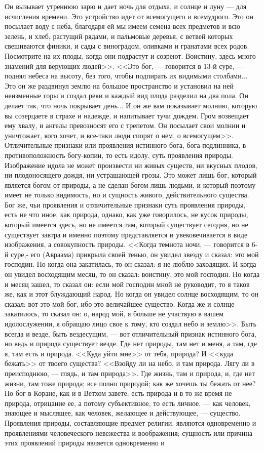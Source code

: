 \documentclass[12pt]{article}
\begin{document}
Он вызывает утреннюю зарю и дает ночь для отдыха, и солнце и луну --- для исчисления времени. Это устройство идет от всемогущего и всемудрого. Это он посылает воду с неба, благодаря ей мы имеем семена всех предметов и всю зелень, и хлеб, растущий рядами, и пальмовые деревья, с ветвей которых свешиваются финики, и сады с виноградом, оливками и гранатами всех родов. Посмотрите на их плоды, когда они подрастут и созреют. Воистину, здесь много знамений для верующих людей>>. <<Это бог, --- говорится в 13-й суре, --- поднял небеса на высоту, без того, чтобы подпирать их видимыми столбами... Это он же раздвинул землю на большое пространство и установил на ней неизменные горы и создал реки и каждый вид плода разделил на два пола. Он делает так, что ночь покрывает день... И он же вам показывает молнию, которую вы созерцаете в страхе и надежде, и напитывает тучи дождем. Гром возвещает ему хвалу, и ангелы превозносят его с трепетом. Он посылает свои молнии и уничтожает, кого хочет, и все-таки люди спорят о нем, о всемогущем>>. Отличительные признаки или проявления истинного бога, бога-подлинника, в противоположность богу-копии, то есть идолу, суть проявления природы. Изображение идола не может произвести ни живых существ, ни вкусных плодов, ни плодоносящего дождя, ни устрашающей грозы. Это может лишь бог, который является богом от природы, а не сделан богом лишь людьми, и который поэтому имеет не только видимость, но и сущность живого, действительного существа. Бог же, чьи проявления и отличительные признаки суть проявления природы, есть не что иное, как природа, однако, как уже говорилось, не кусок природы, который имеется здесь, но не имеется там, который существует сегодня, но не существует завтра и именно поэтому представляется и увековечивается в виде изображения, а совокупность природы. <<Когда темнота ночи, --- говорится в 6-й суре,- его (Авраама) прикрыла своей тенью, он увидел звезду и сказал: это мой господин. Но когда она закатилась, то он сказал: я не люблю заходящих. И когда он увидел восходящим месяц, то он сказал: воистину, это мой господин. Но когда и месяц зашел, то сказал он: если мой господин мной не руководит, то я таков же, как и этот блуждающий народ. Но когда он увидел солнце восходящим, то он сказал: вот это мой бог, ибо это величайшее существо. Когда же и солнце закатилось, то сказал он: о, народ мой, я больше не участвую в вашем идолослужении, я обращаю лицо свое к тому, кто создал небо и землю>>. Быть всегда и везде, быть вездесущим, --- вот отличительный признак истинного бога, но ведь и природа существует везде. Где нет природы, там нет и меня, а там, где я, там есть и природа. <<Куда уйти мне>> от тебя, природа? И <<куда бежать>> от твоего существа? <<Взойду ли на небо, и там природа. Лягу ли в преисподнюю, --- глядь, и там природа>>. Где жизнь, там и природа, и, где нет жизни, там тоже природа; все полно природой; как же хочешь ты бежать от нее? Но бог в Коране, как и в Ветхом завете, есть природа и в то же время не природа, отрицание ее, а потому субъективное, то есть личное, --- как человек, знающее и мыслящее, как человек, желающее и действующее, --- существо. Проявления природы, составляющие предмет религии, являются одновременно и проявлениями человеческого невежества и воображения; сущность или причина этих проявлений природы является одновременно и 
\end{document}
